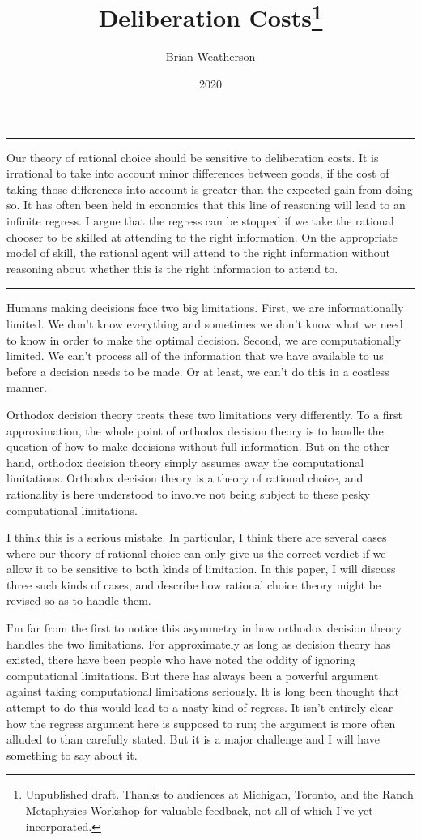 \documentclass[
  10pt,
  letterpaper,
  DIV=11,
  numbers=noendperiod,
  twoside]{scrartcl}
\title{Deliberation Costs\thanks{Unpublished draft. Thanks to audiences
at Michigan, Toronto, and the Ranch Metaphysics Workshop for valuable
feedback, not all of which I've yet incorporated.}}
\author{Brian Weatherson}
\date{2020}
\renewenvironment{abstract}
 {\vspace{-1.25cm}
 \quotation\small\noindent\rule{\linewidth}{.5pt}\par\smallskip
 \noindent }
 {\par\noindent\rule{\linewidth}{.5pt}\endquotation}
\begin{document}
\maketitle
\begin{abstract}
Our theory of rational choice should be sensitive to deliberation costs.
It is irrational to take into account minor differences between goods,
if the cost of taking those differences into account is greater than the
expected gain from doing so. It has often been held in economics that
this line of reasoning will lead to an infinite regress. I argue that
the regress can be stopped if we take the rational chooser to be skilled
at attending to the right information. On the appropriate model of
skill, the rational agent will attend to the right information without
reasoning about whether this is the right information to attend to.
\end{abstract}


Humans making decisions face two big limitations. First, we are
informationally limited. We don't know everything and sometimes we don't
know what we need to know in order to make the optimal decision. Second,
we are computationally limited. We can't process all of the information
that we have available to us before a decision needs to be made. Or at
least, we can't do this in a costless manner.

Orthodox decision theory treats these two limitations very differently.
To a first approximation, the whole point of orthodox decision theory is
to handle the question of how to make decisions without full
information. But on the other hand, orthodox decision theory simply
assumes away the computational limitations. Orthodox decision theory is
a theory of rational choice, and rationality is here understood to
involve not being subject to these pesky computational limitations.

I think this is a serious mistake. In particular, I think there are
several cases where our theory of rational choice can only give us the
correct verdict if we allow it to be sensitive to both kinds of
limitation. In this paper, I will discuss three such kinds of cases, and
describe how rational choice theory might be revised so as to handle
them.

I'm far from the first to notice this asymmetry in how orthodox decision
theory handles the two limitations. For approximately as long as
decision theory has existed, there have been people who have noted the
oddity of ignoring computational limitations. But there has always been
a powerful argument against taking computational limitations seriously.
It is long been thought that attempt to do this would lead to a nasty
kind of regress. It isn't entirely clear how the regress argument here
is supposed to run; the argument is more often alluded to than carefully
stated. But it is a major challenge and I will have something to say
about it.
\end{document}
